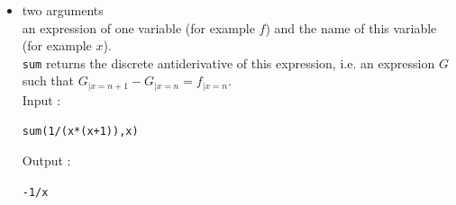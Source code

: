 \documentclass[a4paper,11pt]{book}
\begin{document}
\begin{itemize}
Output  :
\begin{center}{\tt 1/(2*(n+1))-1/n+1/(2*(n-1))}\end{center}
Hence :\\
$\displaystyle \sum_{n=2}^N -\frac{1}{n}=-\sum_{n=1}^{N-1} \frac{1}{n+1}=-\frac{1}{2}-\sum_{n=2}^{N-2} \frac{1}{n+1}-\frac{1}{N}$\\
$\displaystyle \frac{1}{2}*\sum_{n=2}^N \frac{1}{n-1}=\frac{1}{2}*(\sum_{n=0}^{N-2} \frac{1}{n+1})=\frac{1}{2}*(1+\frac{1}{2}+\sum_{n=2}^{N-2}\frac{1}{n+1})$\\
$\displaystyle \frac{1}{2}*\sum_{n=2}^N \frac{1}{n+1}=\frac{1}{2}*(\sum_{n=2}^{N-2} \frac{1}{n+1}+\frac{1}{N}+\frac{1}{N+1})$\\
After simplification by $\sum_{n=2}^{N-2}$, it remains :\\
 $\displaystyle -\frac{1}{2}+\frac{1}{2}*(1+\frac{1}{2})-\frac{1}{N}+\frac{1}{2}*(\frac{1}{N}+\frac{1}{N+1})=\frac{1}{4}-\frac{1}{2N(N+1)}$\\
Therefore :
\begin{itemize}
\item for $N=10$ the sum is equal to : $1/4-1/220=27/110$
\item for $N=+\infty$ the sum is equal to : $1/4$ because $\frac{1}{2N(N+1)}$ 
approaches zero when $N$ approaches infinity.
\end{itemize}

\item two arguments \\
an expression of one variable (for example $f$) and the name of this
 variable (for example $x$).\\
{\tt sum} returns the discrete antiderivative of this expression, i.e. 
an expression $G$ such that $G_{|x=n+1}-G_{|x=n}=f_{|x=n}$.\\ 
Input :
\begin{center}{\tt sum(1/(x*(x+1)),x)}\end{center}
Output  :
\begin{center}{\tt -1/x}\end{center}
\end{itemize}
\end{document}
